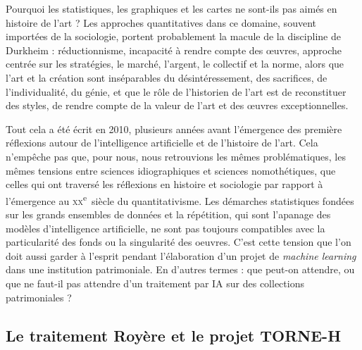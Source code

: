 \vspace{1em}
\noindent
\hspace*{1cm}
\begin{minipage}{\dimexpr\linewidth-2cm}
\fontsize{10}{12}\selectfont
Pourquoi les statistiques, les graphiques et les cartes ne sont-ils pas aimés en histoire de l’art ? Les approches quantitatives dans ce domaine, souvent importées de la sociologie, portent probablement la macule de la discipline de Durkheim : réductionnisme, incapacité à rendre compte des œuvres, approche centrée sur les stratégies, le marché, l’argent, le collectif et la norme, alors que l’art et la création sont inséparables du désintéressement, des sacrifices, de l’individualité, du génie, et que le rôle de l’historien de l’art est de reconstituer des styles, de rendre compte de la valeur de l’art et des œuvres exceptionnelles.                                                \footnotemark{}
\end{minipage}
\vspace{1em}

Tout cela a été écrit en 2010, plusieurs années avant l'émergence des première réflexions autour de l'intelligence artificielle et de l'histoire de l'art. Cela n'empêche pas que, pour nous, nous retrouvions les mêmes problématiques, les mêmes tensions entre sciences idiographiques et sciences nomothétiques, que celles qui ont traversé les réflexions en histoire et sociologie par rapport à l'émergence au \textsc{xx}\textsuperscript{e}~siècle du quantitativisme. Les démarches statistiques fondées sur les grands ensembles de données et la répétition, qui sont l'apanage des modèles d'intelligence artificielle, ne sont pas toujours compatibles avec la particularité des fonds ou la singularité des oeuvres. C'est cette tension que l'on doit aussi garder à l'esprit pendant l'élaboration d'un projet de \textit{machine learning} dans une institution patrimoniale. En d'autres termes : que peut-on attendre, ou que ne faut-il pas attendre d'un traitement par IA sur des collections patrimoniales ?

\subsection{Le traitement Royère et le projet TORNE-H}


